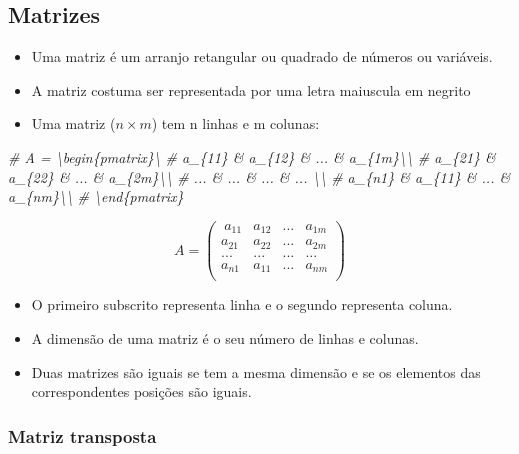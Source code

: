 \documentclass[
]{article}
\newenvironment{Shaded}{\begin{snugshade}}{\end{snugshade}}
\newcommand{\CommentTok}[1]{\textcolor[rgb]{0.56,0.35,0.01}{\textit{#1}}}
\providecommand{\tightlist}{%
  \setlength{\itemsep}{0pt}\setlength{\parskip}{0pt}}
\begin{document}
\hypertarget{matrizes}{%
\subsection{Matrizes}\label{matrizes}}

\begin{itemize}
\item
  Uma matriz é um arranjo retangular ou quadrado de números ou
  variáveis.
\item
  A matriz costuma ser representada por uma letra maiuscula em negrito
\item
  Uma matriz (\(n \times m\)) tem n linhas e m colunas:
\end{itemize}

\begin{Shaded}
\begin{Highlighting}[]
\CommentTok{\# $$A = \textbackslash{}begin\{pmatrix\}\textbackslash{}}
\CommentTok{\# a\_\{11\} \& a\_\{12\} \& ... \& a\_\{1m\}\textbackslash{}\textbackslash{}}
\CommentTok{\# a\_\{21\} \& a\_\{22\} \& ... \& a\_\{2m\}\textbackslash{}\textbackslash{}}
\CommentTok{\# ... \& ... \& ... \& ... \textbackslash{}\textbackslash{}}
\CommentTok{\# a\_\{n1\} \& a\_\{11\} \& ... \& a\_\{nm\}\textbackslash{}\textbackslash{}}
\CommentTok{\# \textbackslash{}end\{pmatrix\}$$}
\end{Highlighting}
\end{Shaded}

\[A = \begin{pmatrix}\
a_{11} & a_{12} & ... & a_{1m}\\
a_{21} & a_{22} & ... & a_{2m}\\
... & ... & ... & ... \\
a_{n1} & a_{11} & ... & a_{nm}\\
\end{pmatrix}\]

\begin{itemize}
\tightlist
\item
  O primeiro subscrito representa linha e o segundo representa coluna.
\item
  A dimensão de uma matriz é o seu número de linhas e colunas.
\item
  Duas matrizes são iguais se tem a mesma dimensão e se os elementos das
  correspondentes posições são iguais.
\end{itemize}

\hypertarget{matriz-transposta}{%
\subsubsection{Matriz transposta}\label{matriz-transposta}}
\end{document}
